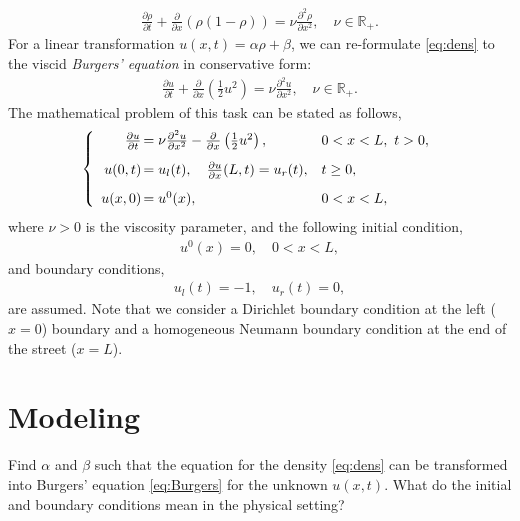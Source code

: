 \documentclass[a4paper,10pt]{article}
\begin{document}
\begin{align}
\label{eq:dens}
 \frac{\partial \rho}{\partial t} + \frac{\partial}{\partial x} \left( \rho (1-\rho) \right) = \nu \frac{\partial^2 \rho}{\partial x^2}, \quad \nu \in \mathbb{R}_+.
\end{align}
For a linear transformation $u(x,t) = \alpha \rho + \beta$, we can re-formulate \eqref{eq:dens} to the viscid \textit{Burgers' equation} in conservative form:
\begin{align}
\label{eq:Burgers}
 \frac{\partial u}{\partial t} + \frac{\partial}{\partial x} \left( \frac{1}{2}u^2 \right) = \nu \frac{\partial^2 u}{\partial x^2} , \quad \nu \in \mathbb{R}_+.
 \end{align}
 The mathematical problem of this task can be stated as follows,
 \begin{align*}
  \left\{ 
\begin{array}{rll}
 \frac{\partial u}{\partial t} \hspace{-0.3cm}&= \nu \frac{\partial^2 u}{\partial x^2} - \frac{\partial}{\partial x} \left( \frac{1}{2}u^2 \right), & 0<x<L, \ t > 0,  \\[2ex]
u(0,t)\hspace{-0.3cm}&=u_{l}(t), \quad \frac{\partial u}{\partial x}(L, t) = u_{r} (t), & t \geq 0,\\[2ex]
u(x,0) \hspace{-0.3cm}&= u^0(x), & 0<x<L,
\end{array}
\right.
\end{align*}
where $\nu > 0$ is the viscosity parameter, and the following initial condition, 
\begin{align}
 \label{eq:init_cond}
 u^0(x) = 0, \quad 0 < x < L,
\end{align}
and boundary conditions,
\begin{align*}
 u_l(t) = -1, \quad u_r(t) = 0,
\end{align*}
are assumed. Note that we consider a Dirichlet boundary condition at the left ($x=0$) boundary and a homogeneous Neumann boundary condition at the end of the street ($x=L$). 
\section{Modeling}
Find $\alpha$ and $\beta$ such that the equation for the density \eqref{eq:dens} can be transformed into Burgers' equation \eqref{eq:Burgers} for the unknown $u(x,t)$. What do the initial and boundary conditions mean in the physical setting? 
\end{document}
